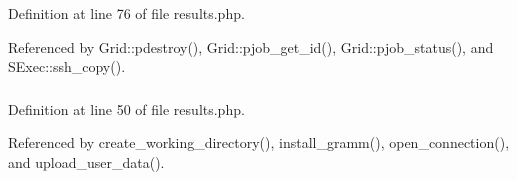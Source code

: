 Definition at line 76 of file results.php.

Referenced by Grid::pdestroy(), Grid::pjob\_\-get\_\-id(), Grid::pjob\_\-status(), and SExec::ssh\_\-copy().
\subsubsection{}\label{results_8php_a1}




Definition at line 50 of file results.php.

Referenced by create\_\-working\_\-directory(), install\_\-gramm(), open\_\-connection(), and upload\_\-user\_\-data().